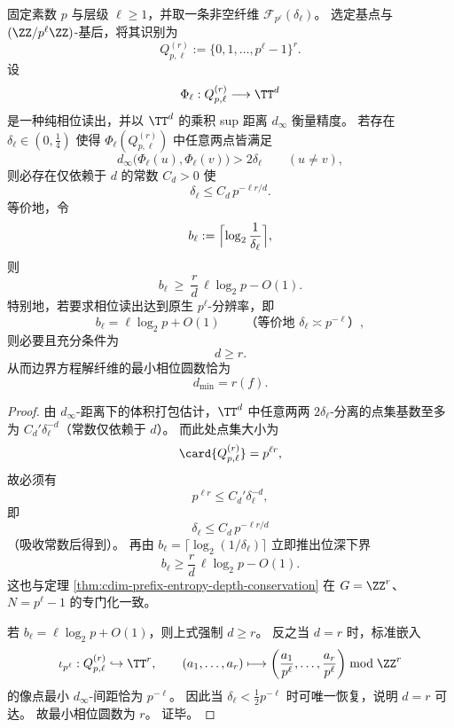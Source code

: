 \begin{theorem}[边界解纤维的最小相位圆数]\label{thm:conclusion-boundary-minimal-phase-circle-count}
固定素数 \(p\) 与层级 \(\ell\ge 1\)，并取一条非空纤维 \(\mathcal F_{p^\ell}(\delta_\ell)\)。
选定基点与 \((\ZZ/p^\ell\ZZ)\)-基后，将其识别为
\[
Q_{p,\ell}^{(r)}:=\{0,1,\dots,p^\ell-1\}^{r}.
\]
设
\[
\Phi_\ell:Q_{p,\ell}^{(r)}\longrightarrow \TT^d
\]
是一种纯相位读出，并以 \(\TT^d\) 的乘积 sup 距离 \(d_\infty\) 衡量精度。
若存在 \(\delta_\ell\in(0,\tfrac14)\) 使得 \(\Phi_\ell(Q_{p,\ell}^{(r)})\) 中任意两点皆满足
\[
d_\infty\bigl(\Phi_\ell(u),\Phi_\ell(v)\bigr)>2\delta_\ell
\qquad(u\neq v),
\]
则必存在仅依赖于 \(d\) 的常数 \(C_d>0\) 使
\[
\delta_\ell\le C_d\,p^{-\ell r/d}.
\]
等价地，令
\[
b_\ell:=\Bigl\lceil \log_2\frac{1}{\delta_\ell}\Bigr\rceil,
\]
则
\[
\boxed{\;
b_\ell\ \ge\ \frac{r}{d}\,\ell\log_2 p-O(1).
\;}
\]
特别地，若要求相位读出达到原生 \(p^\ell\)-分辨率，即
\[
b_\ell=\ell\log_2 p+O(1)
\qquad\text{（等价地 }\delta_\ell\asymp p^{-\ell}\text{）},
\]
则必要且充分条件为
\[
d\ge r.
\]
从而边界方程解纤维的最小相位圆数恰为
\[
\boxed{\;d_{\min}=r(f).\;}
\]
\end{theorem}
\begin{proof}
由 \(d_\infty\)-距离下的体积打包估计，\(\TT^d\) 中任意两两 \(2\delta_\ell\)-分离的点集基数至多为 \(C_d'\delta_\ell^{-d}\)（常数仅依赖于 \(d\)）。
而此处点集大小为
\[
\card{Q_{p,\ell}^{(r)}}=p^{\ell r},
\]
故必须有
\[
p^{\ell r}\le C_d'\delta_\ell^{-d},
\]
即
\[
\delta_\ell\le C_d\,p^{-\ell r/d}
\]
（吸收常数后得到）。
再由 \(b_\ell=\lceil \log_2(1/\delta_\ell)\rceil\) 立即推出位深下界
\[
b_\ell\ge \frac{r}{d}\,\ell\log_2 p-O(1).
\]
这也与定理 \ref{thm:cdim-prefix-entropy-depth-conservation} 在 \(G=\ZZ^r\)、\(N=p^\ell-1\) 的专门化一致。

若 \(b_\ell=\ell\log_2 p+O(1)\)，则上式强制 \(d\ge r\)。
反之当 \(d=r\) 时，标准嵌入
\[
\iota_{p^\ell}:Q_{p,\ell}^{(r)}\hookrightarrow \TT^r,
\qquad
(a_1,\dots,a_r)\longmapsto
\left(\frac{a_1}{p^\ell},\dots,\frac{a_r}{p^\ell}\right)\bmod \ZZ^r
\]
的像点最小 \(d_\infty\)-间距恰为 \(p^{-\ell}\)。
因此当 \(\delta_\ell<\tfrac12 p^{-\ell}\) 时可唯一恢复，说明 \(d=r\) 可达。
故最小相位圆数为 \(r\)。
证毕。
\end{proof}



\endinput
